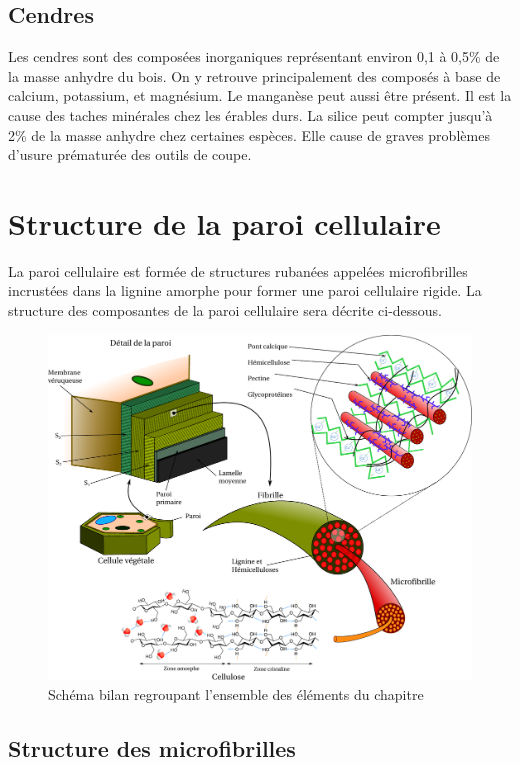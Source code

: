 \subsection{Cendres}

Les cendres sont des composées inorganiques représentant environ 0,1 à 0,5\% de la masse anhydre du bois. On y retrouve principalement des composés à base de calcium, potassium, et magnésium. Le manganèse peut aussi être présent. Il est la cause des taches minérales chez les érables durs. La silice peut compter jusqu'à 2\% de la masse anhydre chez certaines espèces. Elle cause de graves problèmes d'usure prématurée des outils de coupe.

\section{Structure de la paroi cellulaire}

La paroi cellulaire est formée de structures rubanées appelées microfibrilles incrustées dans la lignine amorphe pour former une paroi cellulaire rigide. La structure des composantes de la paroi cellulaire sera décrite ci-dessous.

\begin{figure}[h]
\centering
\includegraphics[scale=0.55]{img/ch6_cellule}
\caption{Schéma bilan regroupant l'ensemble des éléments du chapitre}
\label{fig:grosschema}
\end{figure}

\subsection{Structure des microfibrilles}

